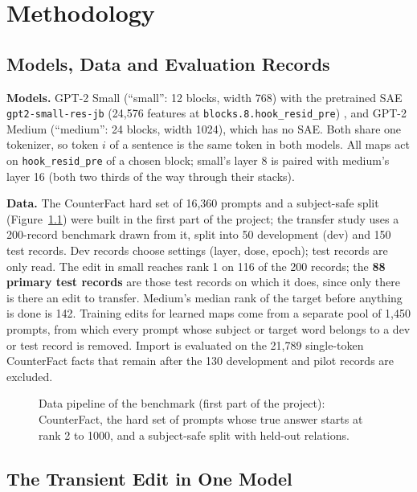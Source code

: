 \chapter{Methodology}\label{ch:method}

\section{Models, Data and Evaluation Records}

\textbf{Models.} GPT-2 Small (``small'': 12 blocks, width 768) \cite{r1} with the pretrained SAE \texttt{gpt2-small-res-jb} (24,576 features at \texttt{blocks.8.hook\_resid\_pre}) \cite{r15}, and GPT-2 Medium (``medium'': 24 blocks, width 1024), which has no SAE. Both share one tokenizer, so token $i$ of a sentence is the same token in both models. All maps act on \texttt{hook\_resid\_pre} of a chosen block; small's layer 8 is paired with medium's layer 16 (both two thirds of the way through their stacks).

\textbf{Data.} The CounterFact hard set of 16,360 prompts and a subject-safe split (Figure~\ref{fig:pipeline}) were built in the first part of the project; the transfer study uses a 200-record benchmark drawn from it, split into 50 development (dev) and 150 test records. Dev records choose settings (layer, dose, epoch); test records are only read. The edit in small reaches rank 1 on 116 of the 200 records; the \textbf{88 primary test records} are those test records on which it does, since only there is there an edit to transfer. Medium's median rank of the target before anything is done is 142. Training edits for learned maps come from a separate pool of 1,450 prompts, from which every prompt whose subject or target word belongs to a dev or test record is removed. Import is evaluated on the 21,789 single-token CounterFact facts that remain after the 130 development and pilot records are excluded.

\begin{figure}[t]
\centering
{}
\caption{Data pipeline of the benchmark (first part of the project): CounterFact, the hard set of prompts whose true answer starts at rank 2 to 1000, and a subject-safe split with held-out relations.}\label{fig:pipeline}
\end{figure}

\section{The Transient Edit in One Model}

